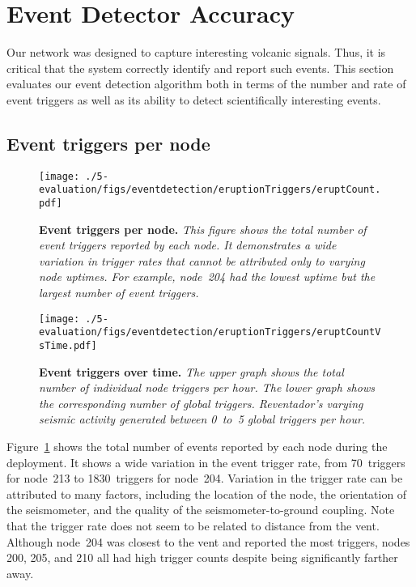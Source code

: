 
\section{Event Detector Accuracy}
\label{sec-eventdetection}

Our network was designed to capture interesting volcanic signals.  Thus, it
is critical that the system correctly identify and report such events.  This
section evaluates our event detection algorithm both in terms of the number
and rate of event triggers as well as its ability to detect
scientifically interesting events.

\subsection{Event triggers per node}

\begin{figure}[t]
\begin{center}
\texttt{[image: ./5-evaluation/figs/eventdetection/eruptionTriggers/eruptCount.pdf]}
\end{center}
\caption{\small{\bf Event triggers per node.}
{\em This figure shows the total number of event triggers reported by each
node. It demonstrates a wide variation in trigger rates that cannot be
attributed only to varying node uptimes. For example, node~204 had the lowest
uptime but the largest number of event triggers.}}
\label{fig-eventspernode}
\end{figure}

\begin{figure}[t]
\begin{center}
\texttt{[image: ./5-evaluation/figs/eventdetection/eruptionTriggers/eruptCountVsTime.pdf]}
\end{center}
\caption{\small{\bf Event triggers over time.}
{\em The upper graph shows the total number of individual node triggers per
hour. The lower graph shows the corresponding number of global
triggers. Reventador's varying seismic activity generated between 0~to~5
global triggers per hour.}}
\label{fig-eventspertime}
\end{figure}

Figure~\ref{fig-eventspernode} shows the total number of events reported by
each node during the deployment. It shows a wide variation in the event
trigger rate, from 70~triggers for node~213 to 1830~triggers for node~204.
Variation in the trigger rate can be attributed to many factors, including the
location of the node, the orientation of the seismometer, and the quality of
the seismometer-to-ground coupling.  Note that the trigger rate does not seem
to be related to distance from the vent. Although node~204 was closest 
to the vent and reported the most triggers, nodes 200, 205, and 210 
all had high trigger counts despite being significantly farther away.

